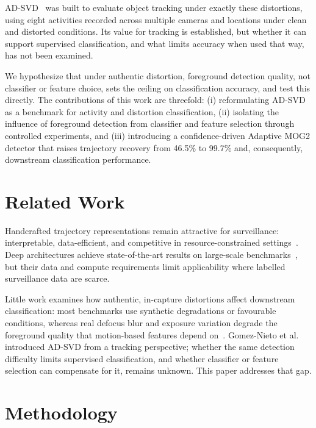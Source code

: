 \documentclass[runningheads]{llncs}
\begin{document}
AD-SVD~\cite{9698081} was built to evaluate object tracking under exactly these distortions, using eight activities recorded across multiple cameras and locations under clean and distorted conditions. Its value for tracking is established, but whether it can support supervised classification, and what limits accuracy when used that way, has not been examined.

We hypothesize that under authentic distortion, foreground detection quality, not classifier or feature choice, sets the ceiling on classification accuracy, and test this directly. The contributions of this work are threefold: (i) reformulating AD-SVD as a benchmark for activity and distortion classification, (ii) isolating the influence of foreground detection from classifier and feature selection through controlled experiments, and (iii) introducing a confidence-driven Adaptive MOG2 detector that raises trajectory recovery from 46.5\% to 99.7\% and, consequently, downstream classification performance.

\section{Related Work}

Handcrafted trajectory representations remain attractive for surveillance: interpretable, data-efficient, and competitive in resource-constrained settings~\cite{ahmed2018trajectory,csurka2018handcrafted}. Deep architectures achieve state-of-the-art results on large-scale benchmarks~\cite{ur2023use}, but their data and compute requirements limit applicability where labelled surveillance data are scarce.

Little work examines how authentic, in-capture distortions affect downstream classification: most benchmarks use synthetic degradations or favourable conditions, whereas real defocus blur and exposure variation degrade the foreground quality that motion-based features depend on~\cite{gillani2025distortion}. Gomez-Nieto et al.~\cite{9698081} introduced AD-SVD from a tracking perspective; whether the same detection difficulty limits supervised classification, and whether classifier or feature selection can compensate for it, remains unknown. This paper addresses that gap.

\section{Methodology}
\end{document}
